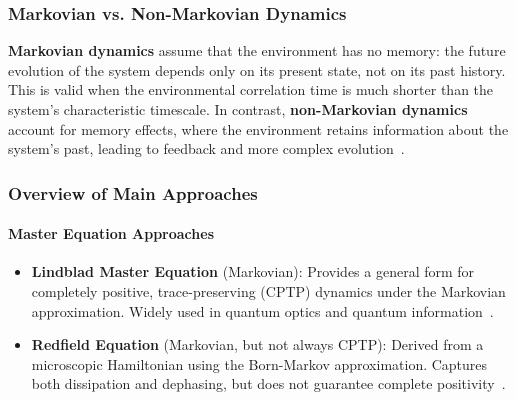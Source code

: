 \subsubsection{Markovian vs. Non-Markovian Dynamics}
\label{subsec:markovian_nonmarkovian}

\noindent
\textbf{Markovian dynamics} assume that the environment has no memory: the future evolution of the system depends only on its present state, not on its past history. This is valid when the environmental correlation time is much shorter than the system's characteristic timescale. In contrast, \textbf{non-Markovian dynamics} account for memory effects, where the environment retains information about the system's past, leading to feedback and more complex evolution~\cite{BreuerPetruccione2009TheoryOpenQuantum, Rivas2014QuantumNonMarkovianityReview}.

\subsubsection{Overview of Main Approaches}

\paragraph{Master Equation Approaches}
\begin{itemize}
    \item \textbf{Lindblad Master Equation} (Markovian): Provides a general form for completely positive, trace-preserving (CPTP) dynamics under the Markovian approximation. Widely used in quantum optics and quantum information~\cite{BreuerPetruccione2009TheoryOpenQuantum, Lindblad1976GeneratorsQuantumDynamical}.
    \item \textbf{Redfield Equation} (Markovian, but not always CPTP): Derived from a microscopic Hamiltonian using the Born-Markov approximation. Captures both dissipation and dephasing, but does not guarantee complete positivity~\cite{Redfield1965TheoryRelaxationProcesses,
              RivasEtAl2014QuantumNonmarkovianityCharacterization,
              LiEtAl2018ConceptsQuantumNonmarkovianity}.
\end{itemize}

